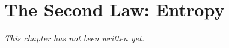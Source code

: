 \chapter{The Second Law: Entropy}\label{ch:b1:second-law-entropy}


\emph{This chapter has not been written yet.}
